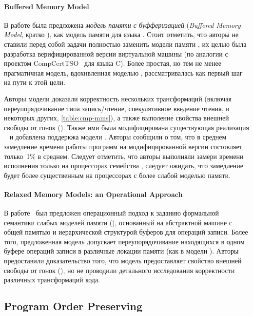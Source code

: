 \paragraph{Buffered Memory Model}

В работе была предложена \emph{модель памяти с буфферизацией}
(\emph{Buffered Memory Model}, кратко \BMM), 
как модель памяти для языка \Java. 
Стоит отметить, что авторы не ставили перед собой задачи
полностью заменить модели памяти \Java, 
их целью была разработка верифицированной 
версии виртуальной машины \Java
(по аналогии с проектом CompCertTSO~\cite{Sevcik-al:JACM13} для языка C). 
Более простая, но тем не менее прагматичная модель, 
вдохнвленная моделью \TSO, рассматривалась 
как первый шаг на пути к этой цели. 

Авторы модели доказали корректность нескольких трансформаций
(включая переупорядочивание типа запись/чтение, 
спекулятивное введение чтения, и некоторых других, 
\see \cref{table:cmp-mms}), 
а также выполение свойства внешней свободы от гонок (\eDRF).
Также ими была модифицирована существующая реализация 
\JVM~\cite{Pizlo-al:ECCS10} и добавлена поддеркжа модели \BMM. 
Авторы сообщили о том, что в среднем замедление времени работы 
программ на модифицированной версии \JVM состовляет только~1\% в среднем. 
Следует отметить, что авторы выполняли замери времени исполнения 
только на процессорах семейства \Intel, 
следует ожидать, что замедление будет более существенным 
на процессорах с более слабой моделью памяти. 

\paragraph{Relaxed Memory Models: an Operational Approach}

В работе~\cite{Boudol-Petri:POPL09} был предложен 
операционный подход к заданию формальной семантики 
слабых моделей памяти (\RMMOA), 
основанный на абстрактной машине с общей памятью 
и иерархической структурой буферов для операций записи.
Более того, предложенная модель допускает
переупорядочивание находящихся в одном буфере
операций записи в различные локации памяти
(как в модели \PSO).
Авторы предоставили доказательство того,
что модель предоставляет свойство внешней свободы от гонок (\eDRF), 
но не проводили детального исследования 
корректности различных трансформаций кода. 

\subsection{Program Order Preserving}
\label{sec:catalog:porf}

